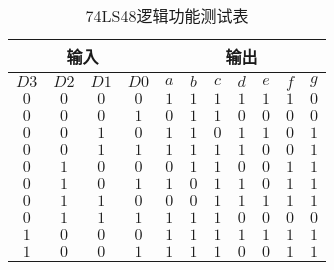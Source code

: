 \documentclass{ctexart}
\begin{document}
    \begin{table}
    	\centering
    	\caption{74LS48逻辑功能测试表}
    	\begin{tabular}{|c|c|c|c|c|c|c|c|c|c|c|}
    		\hline
    		\multicolumn{4}{|c|}{输入} & \multicolumn{7}{|c|}{输出}\\
    		\hline
    		$D3$ & $D2$ & $D1$ & $D0$ & $a$ & $b$ & $c$ & $d$ & $e$ & $f$ & $g$\\
    		\hline
    		$0$ & $0$ & $0$ & $0$ & $1$ & $1$ & $1$ & $1$ & $1$ & $1$ & $0$\\
    		\hline
    		$0$ & $0$ & $0$ & $1$ & $0$ & $1$ & $1$ & $0$ & $0$ & $0$ & $0$\\
    		\hline
    		$0$ & $0$ & $1$ & $0$ & $1$ & $1$ & $0$ & $1$ & $1$ & $0$ & $1$\\
    		\hline
    		$0$ & $0$ & $1$ & $1$ & $1$ & $1$ & $1$ & $1$ & $0$ & $0$ & $1$\\
    		\hline
    		$0$ & $1$ & $0$ & $0$ & $0$ & $1$ & $1$ & $0$ & $0$ & $1$ & $1$\\
    		\hline
    		$0$ & $1$ & $0$ & $1$ & $1$ & $0$ & $1$ & $1$ & $0$ & $1$ & $1$\\
    		\hline
    		$0$ & $1$ & $1$ & $0$ & $0$ & $0$ & $1$ & $1$ & $1$ & $1$ & $1$\\
    		\hline
    		$0$ & $1$ & $1$ & $1$ & $1$ & $1$ & $1$ & $0$ & $0$ & $0$ & $0$\\
    		\hline
    		$1$ & $0$ & $0$ & $0$ & $1$ & $1$ & $1$ & $1$ & $1$ & $1$ & $1$\\
    		\hline
    		$1$ & $0$ & $0$ & $1$ & $1$ & $1$ & $1$ & $0$ & $0$ & $1$ & $1$\\
    		\hline
    	\end{tabular}
    \end{table}
\end{document}
